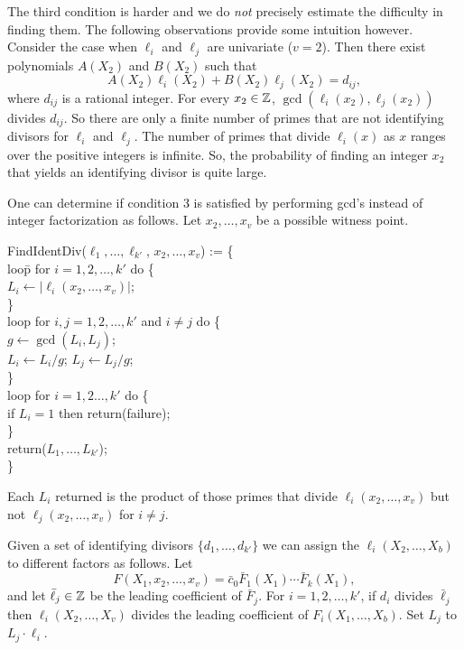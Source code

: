 The third condition is harder and we do {\em not} precisely estimate
the difficulty in finding them.   The following observations provide
some intuition however.  Consider the case when $\ell_i$ and $\ell_j$
are univariate ($v = 2$).  Then there exist polynomials $A(X_2)$ and
$B(X_2)$ such that
\[
A(X_2) \ell_i (X_2)+ B(X_2) \ell_j (X_2) = d_{ij},
\]
where $d_{ij}$ is a rational integer.  For every $x_2 \in \mathbb{Z}$,
$\gcd(\ell_{i}(x_2), \ell_{j}(x_2))$ divides $d_{ij}$.  So there are
only a finite number of primes that are not identifying divisors for
$\ell_i$ and $\ell_j$.  The number of primes that divide $\ell_i(x)$
as $x$ ranges over the positive integers is infinite.  So, the
probability of finding an integer $x_2$ that yields an identifying
divisor is quite large.

One can determine if condition 3 is satisfied by performing {\sc gcd}'s
instead of integer factorization as follows.  Let $x_2, \ldots, x_v$ be a
possible witness point.

\begindsacode
FindIdentDiv($\ell_1, \ldots, \ell_{k'}$, $x_2, \ldots, x_v$) := \{ \\
\> loo\=p for $i = 1, 2, \ldots, k'$ do \{ \\
\>\> $L_i \leftarrow |\ell_i(x_2, \ldots, x_v)|$; \\
\>\> \} \\
\> loop for $i, j = 1, 2, \ldots, k'$ and $i \not= j$ do \{ \\
\>\> $g \leftarrow \gcd(L_i, L_j)$; \\
\>\> $L_i \leftarrow L_i/g$; $L_j \leftarrow L_j/g$; \\
\>\> \} \\
\> loop for $i = 1, 2 \ldots, k'$ do \{ \\
\>\> if $L_i = 1$ then return(failure); \\
\>\> \} \\
\> return($L_1, \ldots, L_{k'}$); \\
\> \} 
\enddsacode

\noindent
Each $L_i$ returned is the product of those primes that divide
$\ell_i(x_2, \ldots, x_v)$ but not $\ell_j(x_2, \ldots, x_v)$ for $i
\not= j$.

\medskip
Given a set of identifying divisors $\{ d_1, \ldots, d_{k'} \}$ we
can assign the $\ell_i(X_2, \ldots, X_b)$ to different factors as
follows.  Let 
\[
F(X_1, x_2, \ldots, x_v) = \bar{c}_0 \bar{F}_1(X_1) \cdots
\bar{F}_k(X_1),
\]
and let $\bar{\ell}_j \in \mathbb{Z}$ be the leading coefficient of
$\bar{F}_j$.  For $i = 1, 2, \ldots, k'$, if $d_i$ divides
$\bar{\ell}_j$ then $\ell_i(X_2, \ldots, X_v)$ divides the leading
coefficient of $F_i(X_1, \ldots, X_b)$.  Set $L_j$ to $L_j \cdot
\ell_i$.

